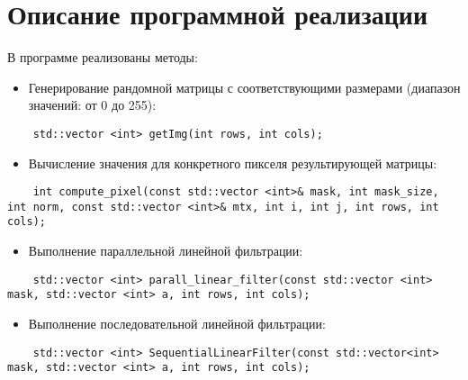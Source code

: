 \documentclass{report}
\begin{document}
\section*{Описание программной реализации}
В программе реализованы методы:
\begin{itemize}
\item Генерирование рандомной матрицы с соответствующими размерами (диапазон значений: от 0 до 255): 
\end{itemize}
\begin{lstlisting}
	std::vector <int> getImg(int rows, int cols);
\end{lstlisting}
\begin{itemize}
\item Вычисление значения для конкретного пикселя результирующей матрицы:
\end{itemize}
\begin{lstlisting}
	int compute_pixel(const std::vector <int>& mask, int mask_size, int norm, const std::vector <int>& mtx, int i, int j, int rows, int cols);
\end{lstlisting}
\begin{itemize}
\item Выполнение параллельной линейной фильтрации: 
\end{itemize}
\begin{lstlisting}
	std::vector <int> parall_linear_filter(const std::vector <int> mask, std::vector <int> a, int rows, int cols);
\end{lstlisting}
\begin{itemize}
\item Выполнение последовательной линейной фильтрации: 
\end{itemize}
\begin{lstlisting}
	std::vector <int> SequentialLinearFilter(const std::vector<int> mask, std::vector <int> a, int rows, int cols);
\end{lstlisting}

\newpage
\end{document}
